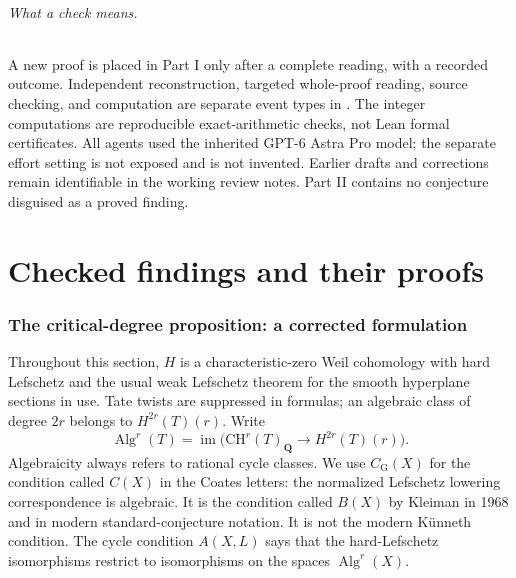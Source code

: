 \documentclass[11pt,a4paper]{article}
\theoremstyle{definition}
\theoremstyle{remark}
\begin{document}
\paragraph{What a check means.}
A new proof is placed in Part I only after a complete reading,
with a recorded outcome. Independent reconstruction, targeted
whole-proof reading, source checking, and computation are separate
event types in . The integer computations
are reproducible exact-arithmetic checks, not Lean formal
certificates. All agents used the inherited GPT-6 Astra Pro model;
the separate effort setting is not exposed and is not invented.
Earlier drafts and corrections remain identifiable in the working
review notes. Part II contains no conjecture disguised as a proved
finding.

\part{Checked findings and their proofs}



\section{The critical-degree proposition: a corrected formulation}
\label{sec:critical-proposition}

Throughout this section, $H$ is a characteristic-zero Weil cohomology
with hard Lefschetz and the usual weak Lefschetz theorem for the smooth
hyperplane sections in use.  Tate twists are suppressed in formulas; an
algebraic class of degree $2r$ belongs to $H^{2r}(T)(r)$.
Write
\[
 \operatorname{Alg}^r(T)=\operatorname{im}\bigl(
 \mathrm{CH}^r(T)_{\mathbf Q}\longrightarrow H^{2r}(T)(r)\bigr).
\]
Algebraicity always refers to rational cycle classes.  We use
$C_{\mathrm G}(X)$ for the condition called $C(X)$ in the Coates
letters: the normalized Lefschetz lowering correspondence is algebraic.
It is the condition called $B(X)$ by Kleiman in 1968 and in modern
standard-conjecture notation.  It is not the modern K\"unneth condition.
The cycle condition $A(X,L)$ says that the hard-Lefschetz isomorphisms
restrict to isomorphisms on the spaces $\operatorname{Alg}^r(X)$.
\end{document}
